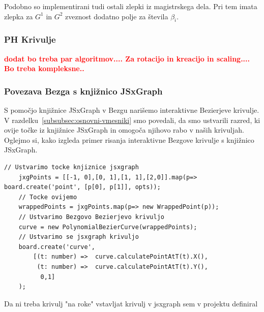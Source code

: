 \documentclass[isrm2, tisk]{fmfdelo}
\newcommand{\mycomment}[1]{\textbf{\textcolor{red}{#1}}}
\begin{document}
    Podobno so implementirani tudi ostali zlepki iz magistrskega dela.
    Pri tem imata zlepka za $G^1$ in $G^2$ zveznost dodatno polje za števila $\beta_i$.
    \subsubsection{PH Krivulje}
    \mycomment{dodat bo treba par algoritmov.... Za rotacijo in kreacijo in scaling.... Bo treba kompleksne..}

    \subsubsection{Povezava Bezga s knjižnico JSxGraph}
    S pomočjo knjižnice JSxGraph v Bezgu narišemo interaktivne Bezierjeve krivulje.
    V razdelku~\ref{subsubsec:osnovni-vmesniki} smo povedali, da smo ustvarili razred, ki ovije točke iz knjižnice JSxGraph in omogoča njihovo rabo v naših krivuljah.
    Oglejmo si, kako izgleda primer risanja interaktivne Bezgove krivulje s knjižnico JSxGraph.
    \begin{lstlisting}[label={lst:ghdfg}]
    // Ustvarimo tocke knjiznice jsxgraph
    jxgPoints = [[-1, 0],[0, 1],[1, 1],[2,0]].map(p=> board.create('point', [p[0], p[1]], opts));
    // Tocke ovijemo
    wrappedPoints = jxgPoints.map(p=> new WrappedPoint(p));
    // Ustvarimo Bezgovo Bezierjevo krivuljo
    curve = new PolynomialBezierCurve(wrappedPoints);
    // Ustvarimo se jsxgraph krivuljo
    board.create('curve',
        [(t: number) =>  curve.calculatePointAtT(t).X(),
         (t: number) =>  curve.calculatePointAtT(t).Y(),
          0,1]
    );
    \end{lstlisting}
    Da ni treba krivulj "na roke" vstavljat krivulj v jsxgraph sem v projektu definiral
\end{document}
